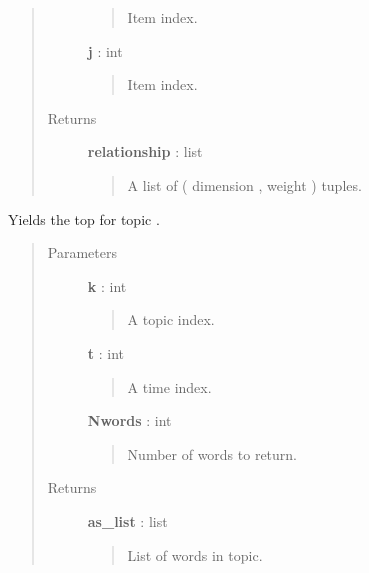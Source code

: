 \documentclass[letterpaper,10pt,english]{sphinxmanual}
\begin{document}
\begin{fulllineitems}
\begin{fulllineitems}
\begin{quote}
\begin{description}
\begin{quote}
Item index.
\end{quote}

\textbf{j} : int
\begin{quote}

Item index.
\end{quote}

\item[{Returns}] \leavevmode
\textbf{relationship} : list
\begin{quote}

A list of ( dimension ,  weight ) tuples.
\end{quote}

\end{description}\end{quote}

\end{fulllineitems}


\begin{fulllineitems}
\label{tethne.model.corpus.dtmmodel:tethne.model.corpus.dtmmodel.DTMModel.list_topic}
Yields the top  for topic .
\begin{quote}\begin{description}
\item[{Parameters}] \leavevmode
\textbf{k} : int
\begin{quote}

A topic index.
\end{quote}

\textbf{t} : int
\begin{quote}

A time index.
\end{quote}

\textbf{Nwords} : int
\begin{quote}

Number of words to return.
\end{quote}

\item[{Returns}] \leavevmode
\textbf{as\_list} : list
\begin{quote}

List of words in topic.
\end{quote}

\end{description}\end{quote}


\end{fulllineitems}
\end{fulllineitems}
\end{document}

